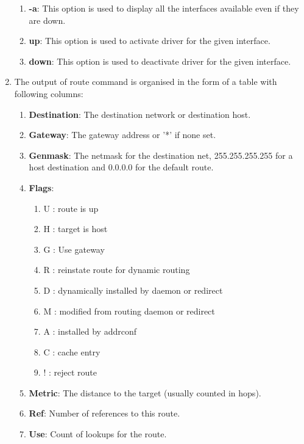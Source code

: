 \documentclass[a4paper,11pt]{article}
\begin{document}
\begin{enumerate}[itemsep=-3pt,label=(\alph*)]
\begin{enumerate}[itemsep=0pt,label=(\roman*)]
         	\item \textbf{-a}: This option is used to display all the interfaces available even if they are down.
         	\item \textbf{up}: This option is used to activate driver for the given interface.
         	\item \textbf{down}: This option is used to deactivate driver for the given interface.
         \end{enumerate}
     \item The output of route command is organised in the form of a table with following columns:\vspace{-2mm}
          \begin{enumerate}[itemsep=0pt,label=(\roman*)]
          	\item \textbf{Destination}: The destination network or destination host.
          	\item \textbf{Gateway}: The gateway address or ’*’ if none set.
          	\item \textbf{Genmask}: The netmask for the destination net, 255.255.255.255 for a host destination and 0.0.0.0 for the default route.
          	\item \textbf{Flags}:\vspace{-1mm}
          	\begin{enumerate}[itemsep=0pt,label=(\arabic*)]
          		\item U : route is up
          		\item H : target is host 
          		\item G : Use gateway 
          		\item R : reinstate route for dynamic routing
          		\item D : dynamically installed by daemon or redirect 
          		\item M : modified from routing daemon or redirect
          		\item A : installed by addrconf 
          		\item C : cache entry 
          		\item ! : reject route
            \end{enumerate}\vspace{0mm} 
          \item \textbf{Metric}: The distance to the target (usually counted in hops).
          \item \textbf{Ref}: Number of references to this route.
          \item \textbf{Use}: Count of lookups for the route. 

\end{enumerate}
\end{enumerate}
\end{document}
